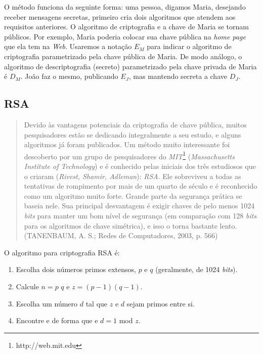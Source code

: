 \documentclass{abnt}
\begin{document}
O método funciona da seguinte forma: uma pessoa, digamos Maria, desejando receber mensagens secretas, primeiro cria dois algoritmos que atendem
aos requisitos anteriores. O algoritmo de criptografia e a chave de Maria se tornam públicos. Por exemplo, Maria poderia colocar sua chave pública
na \textit{home page} que ela tem na \textit{Web}. Usaremos a notação $E_M$ para indicar o algoritmo de criptografia parametrizado pela chave pública
de Maria. De modo análogo, o algoritmo de descriptografia (secreto) parametrizado pela chave privada de Maria é $D_M$. João faz o mesmo, publicando
$E_J$, mas mantendo secreta a chave $D_J$.


\subsection{RSA}

\begin{quotation}

Devido às vantagens potenciais da criptografia de chave pública, muitos pesquisadores estão se dedicando integralmente a seu estudo, e alguns algoritmos
já foram publicados. Um método muito interessante foi descoberto por um grupo de pesquisadores do \textit{MIT}\footnote{http://web.mit.edu} (\textit{Massachusetts Institute of Technology})
e é conhecido pelas iniciais dos três estudiosos que o criaram (\textit{Rivest, Shamir, Adleman}): \textit{RSA}. Ele sobreviveu a todas as tentativas de rompimento por mais de um quarto de século e é reconhecido como um
algoritmo muito forte. Grande parte da segurança prática se baseia nele. Sua principal desvantagem é exigir chaves de pelo menos 1024 \textit{bits} para manter um
bom nível de segurança (em comparação com 128 \textit{bits} para os algoritmos de chave simétrica), e isso o torna bastante lento. (TANENBAUM, A. S.; Redes de Computadores, 2003, p. 566)

\end{quotation}


O algoritmo para criptografia RSA é:

\begin{enumerate}

	\item Escolha dois números primos extensos, $p$ e $q$ (geralmente, de 1024 \textit{bits}).
	\item Calcule $n = p$ $q$ e $z = (p - 1) (q - 1)$.
	\item Escolha um número $d$ tal que $z$ e $d$ sejam primos entre si.
	\item Encontre e de forma que e $d = 1$ mod $z$.

\end{enumerate}
\end{document}
